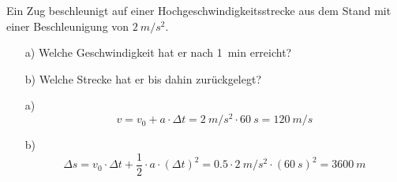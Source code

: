 
\begin{aufgabe}
Ein Zug beschleunigt auf einer Hochgeschwindigkeitsstrecke aus dem Stand
mit einer Beschleunigung von $\SI{2}{m/s^2}$.\\
\begin{itemize}
	\item[a)] Welche Geschwindigkeit hat er nach \SI{1}{min} erreicht?
	\item[b)] Welche Strecke hat er bis dahin zurückgelegt?
\end{itemize}



\begin{loesung}
\begin{itemize}
	\item[a)] \[v = v_0 + a \cdot \Delta t = \SI{2}{m/s^2}\cdot \SI{60}{s} = \SI{120}{m/s}\]
	\item[b)] \[\Delta s = v_0\cdot\Delta t + \frac{1}{2} \cdot a \cdot (\Delta t)^2 = 0.5 \cdot \SI{2}{m/s^2} \cdot (\SI{60}{s})^2 = \SI{3600}{m}\]
\end{itemize}
\end{loesung}
\end{aufgabe}
